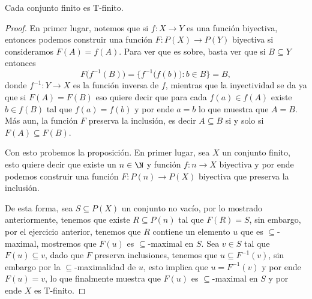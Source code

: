 \begin{exercise}[1.12]
  Cada conjunto finito es T-finito.
\end{exercise}
\begin{proof}
  En primer lugar, notemos que si $f \colon X \to Y$ es una función biyectiva, entonces podemos construir una función $F \colon P(X) \to P(Y)$ biyectiva si consideramos $F(A) = f(A)$. Para ver que es sobre, basta ver que si $B \subseteq Y$ entonces
  \[
    F\bigl(f^{-1}(B)\bigr) = \bigl\{ f^{-1}\bigl(f(b)\bigr) : b \in B \bigr\} = B,
  \]
  donde $f^{-1}\colon Y \to X$ es la función inversa de $f$, mientras que la inyectividad se da ya que si $F(A) = F(B)$ eso quiere decir que para cada $f(a) \in f(A)$ existe $b \in f(B)$ tal que $f(a) = f(b)$ y por ende $a = b$ lo que muestra que $A = B$. Más aun, la función $F$ preserva la inclusión, es decir $A \subseteq B$ si y solo si $F(A) \subseteq F(B)$.

  Con esto probemos la proposición. En primer lugar, sea $X$ un conjunto finito, esto quiere decir que existe un $n \in \N$ y función $f \colon n \to X$ biyectiva y por ende podemos construir una función $F \colon P(n) \to P(X)$ biyectiva que preserva la inclusión.

  De esta forma, sea $S \subseteq P(X)$ un conjunto no vacío, por lo mostrado anteriormente, tenemos que existe $R \subseteq P(n)$ tal que $F(R) = S$, sin embargo, por el ejercicio anterior, tenemos que $R$ contiene un elemento $u$ que es $\subseteq$-maximal, mostremos que $F(u)$ es $\subseteq$-maximal en $S$. Sea $v \in S$ tal que $F(u) \subseteq v$, dado que $F$ preserva inclusiones, tenemos que $u \subseteq F^{-1}(v) $, sin embargo por la $\subseteq$-maximalidad de $u$, esto implica que $u = F^{-1}(v)$ y por ende $F(u) = v$, lo que finalmente muestra que $F(u)$ es $\subseteq$-maximal en $S$ y por ende $X$ es T-finito.
\end{proof}